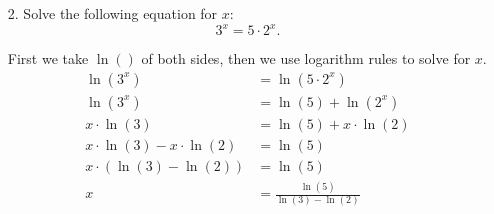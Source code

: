 \documentclass[11pt]{article}
\begin{document}
\newsavebox{\quizback}
\begin{lrbox}{\quizback}
\begin{minipage}[top][4.5in][t]{\textwidth} \setlength{\parindent}{1.5em}
\begin{itemize}
\item[2.] Solve the following equation for $x$:
  \[
  3^x = 5\cdot 2^x.
  \]

  \color{blue} \vfill

  First we take $\ln()$ of both sides, then we use logarithm rules to
  solve for $x$.
  \begin{align*}
    \ln\left(3^x\right) &= \ln\left(5\cdot 2^x\right)\\
    \ln\left(3^x\right) &= \ln\left(5\right) +\ln\left(2^x\right)\\
    x\cdot \ln\left(3\right) &= \ln\left(5\right) +x\cdot \ln\left(2\right)\\
    x\cdot\ln\left(3\right) - x\cdot \ln\left(2\right) &= \ln\left(5\right)\\
    x\cdot\left(\ln\left(3\right) - \ln\left(2\right)\right) &= \ln\left(5\right)\\
    x&= \frac{\ln\left(5\right)}{\ln\left(3\right) - \ln\left(2\right)}\\
  \end{align*}

  \vfill

\end{itemize}
\end{minipage}
\end{lrbox}

\noindent \usebox{\quizfront}
\vfill
\noindent \usebox{\quizback}

\end{document}
